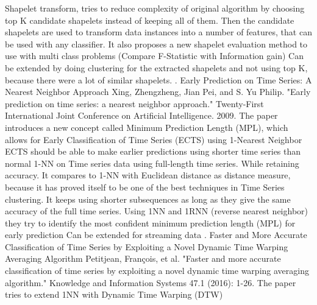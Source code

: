 \newline Shapelet transform, tries to reduce complexity of original algorithm by choosing top K candidate shapelets instead of keeping all of them.
\newline Then the candidate shapelets are used to transform data instances into a number of features, that can be used with any classifier.
\newline It also proposes a new shapelet evaluation method to use with multi class problems (Compare F-Statistic with Information gain)
\newline Can be extended by doing clustering for the extracted shapelets and not using top K, because there were a lot of similar shapelets.
. Early Prediction on Time Series: A Nearest Neighbor Approach
\newline Xing, Zhengzheng, Jian Pei, and S. Yu Philip. "Early prediction on time series: a nearest neighbor approach." Twenty-First International Joint Conference on Artificial Intelligence. 2009.
\newline The paper introduces a new concept called Minimum Prediction Length (MPL), which allows for Early Classification of Time Series (ECTS) using 1-Nearest Neighbor
\newline ECTS should be able to make earlier predictions using shorter time series than normal 1-NN on Time series data using full-length time series. While retaining accuracy.
\newline It compares to 1-NN with Euclidean distance as distance measure, because it has proved itself to be one of the best techniques in Time Series clustering.
\newline It keeps using shorter subsequences as long as they give the same accuracy of the full time series.
\newline Using 1NN and 1RNN (reverse nearest neighbor) they try to identify the most confident minimum prediction length (MPL) for early prediction
\newline Can be extended for streaming data
. Faster and More Accurate Classification of Time Series by Exploiting a Novel Dynamic Time Warping Averaging Algorithm
\newline Petitjean, François, et al. "Faster and more accurate classification of time series by exploiting a novel dynamic time warping averaging algorithm." Knowledge and Information Systems 47.1 (2016): 1-26.
\newline The paper tries to extend 1NN with Dynamic Time Warping (DTW)
